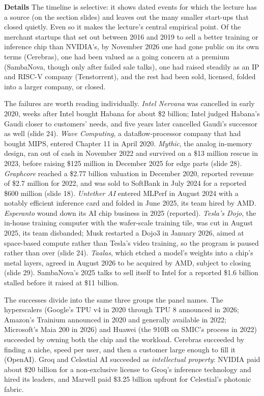 \documentclass[11pt,letterpaper]{article}
\newcommand{\para}[1]{\medskip\noindent\textbf{#1}\quad}
\begin{document}
\para{Details} The timeline is selective: it shows dated events for which the lecture has a source (on the section slides) and leaves out the many smaller start-ups that closed quietly. Even so it makes the lecture's central empirical point. Of the merchant startups that set out between 2016 and 2019 to sell a better training or inference chip than NVIDIA's, by November 2026 one had gone public on its own terms (Cerebras), one had been valued as a going concern at a premium (SambaNova, though only after failed sale talks), one had raised steadily as an IP and RISC-V company (Tenstorrent), and the rest had been sold, licensed, folded into a larger company, or closed.

The failures are worth reading individually. \emph{Intel Nervana} was cancelled in early 2020, weeks after Intel bought Habana for about \$2 billion; Intel judged Habana's Gaudi closer to customers' needs, and five years later cancelled Gaudi's successor as well (slide 24). \emph{Wave Computing}, a dataflow-processor company that had bought MIPS, entered Chapter 11 in April 2020. \emph{Mythic}, the analog in-memory design, ran out of cash in November 2022 and survived on a \$13 million rescue in 2023, before raising \$125 million in December 2025 for edge parts (slide 28). \emph{Graphcore} reached a \$2.77 billion valuation in December 2020, reported revenue of \$2.7 million for 2022, and was sold to SoftBank in July 2024 for a reported \$600 million (slide 18). \emph{Untether AI} entered MLPerf in August 2024 with a notably efficient inference card and folded in June 2025, its team hired by AMD. \emph{Esperanto} wound down its AI chip business in 2025 (reported). \emph{Tesla's Dojo}, the in-house training computer with the wafer-scale training tile, was cut in August 2025, its team disbanded; Musk restarted a Dojo3 in January 2026, aimed at space-based compute rather than Tesla's video training, so the program is paused rather than over (slide 24). \emph{Taalas}, which etched a model's weights into a chip's metal layers, agreed in August 2026 to be acquired by AMD, subject to closing (slide 29). SambaNova's 2025 talks to sell itself to Intel for a reported \$1.6 billion stalled before it raised at \$11 billion.

The successes divide into the same three groups the panel names. The hyperscalers (Google's TPU v4 in 2020 through TPU 8 announced in 2026; Amazon's Trainium announced in 2020 and generally available in 2022; Microsoft's Maia 200 in 2026) and Huawei (the 910B on SMIC's process in 2022) succeeded by owning both the chip and the workload. Cerebras succeeded by finding a niche, speed per user, and then a customer large enough to fill it (OpenAI). Groq and Celestial AI succeeded as \emph{intellectual property}: NVIDIA paid about \$20 billion for a non-exclusive license to Groq's inference technology and hired its leaders, and Marvell paid \$3.25 billion upfront for Celestial's photonic fabric.
\end{document}
